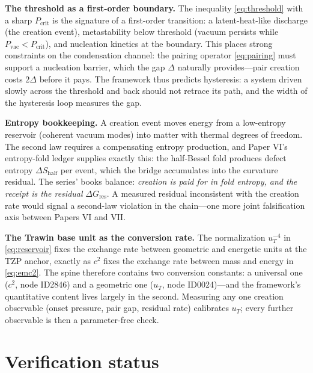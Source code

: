 \documentclass[11pt]{article}
\theoremstyle{remark}
\begin{document}
\textbf{The threshold as a first-order boundary.} The inequality \eqref{eq:threshold} with a sharp $P_{\mathrm{crit}}$ is the signature of a first-order transition: a latent-heat-like discharge (the creation event), metastability below threshold (vacuum persists while $P_{\mathrm{vac}} < P_{\mathrm{crit}}$), and nucleation kinetics at the boundary. This places strong constraints on the condensation channel: the pairing operator \eqref{eq:pairing} must support a nucleation barrier, which the gap $\Delta$ naturally provides---pair creation costs $2\Delta$ before it pays. The framework thus predicts hysteresis: a system driven slowly across the threshold and back should not retrace its path, and the width of the hysteresis loop measures the gap.

\textbf{Entropy bookkeeping.} A creation event moves energy from a low-entropy reservoir (coherent vacuum modes) into matter with thermal degrees of freedom. The second law requires a compensating entropy production, and Paper VI's entropy-fold ledger supplies exactly this: the half-Bessel fold produces defect entropy $\Delta S_{\mathrm{half}}$ per event, which the bridge accumulates into the curvature residual. The series' books balance: \emph{creation is paid for in fold entropy, and the receipt is the residual} $\Delta G_{\mathrm{res}}$. A measured residual inconsistent with the creation rate would signal a second-law violation in the chain---one more joint falsification axis between Papers VI and VII.

\textbf{The Trawin base unit as the conversion rate.} The normalization $u_T^{-4}$ in \eqref{eq:reservoir} fixes the exchange rate between geometric and energetic units at the TZP anchor, exactly as $c^2$ fixes the exchange rate between mass and energy in \eqref{eq:emc2}. The spine therefore contains two conversion constants: a universal one ($c^2$, node ID2846) and a geometric one ($u_T$, node ID0024)---and the framework's quantitative content lives largely in the second. Measuring any one creation observable (onset pressure, pair gap, residual rate) calibrates $u_T$; every further observable is then a parameter-free check.

\section{Verification status}
\label{sec:guardrails}
\end{document}
